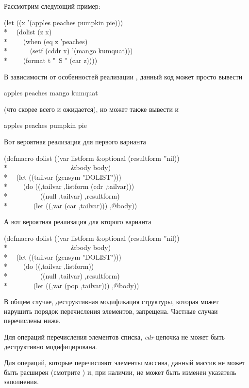 Рассмотрим следующий пример:
\begin{lisp}
(let ((x '(apples peaches pumpkin pie))) \\*
~~(dolist (z x) \\*
~~~~(when (eq z 'peaches) \\*
~~~~~~(setf (cddr x) '(mango kumquat))) \\*
~~~~(format t "~S " (car z))))
\end{lisp}
В зависимости от особенностей реализации , данный код может просто
вывести
\begin{lisp}
apples peaches mango kumquat
\end{lisp}
(что скорее всего и ожидается), но может также вывести и
\begin{lisp}
apples peaches pumpkin pie
\end{lisp}
Вот вероятная реализация  для первого варианта
\begin{lisp}
(defmacro dolist ((var listform \&optional (resultform ''nil)) \\*
~~~~~~~~~~~~~~~~~~\&body body) \\*
~~(let ((tailvar (gensym "DOLIST"))) \\*
~~~~{\Xbq}(do ((,tailvar ,listform (cdr ,tailvar))) \\*
~~~~~~~~~((null ,tailvar) ,resultform) \\*
~~~~~~~(let ((,var (car ,tailvar))) ,@body))
\end{lisp}
А вот вероятная реализация  для второго варианта
\begin{lisp}
(defmacro dolist ((var listform \&optional (resultform ''nil)) \\*
~~~~~~~~~~~~~~~~~~\&body body) \\*
~~(let ((tailvar (gensym "DOLIST"))) \\*
~~~~{\Xbq}(do ((,tailvar ,listform)) \\*
~~~~~~~~~((null ,tailvar) ,resultform) \\*
~~~~~~~(let ((,var (pop ,tailvar))) ,@body))
\end{lisp}

В общем случае, деструктивная модификация структуры, которая может нарушить
порядок перечисления элементов, запрещена. Частные случаи
перечислены ниже.

Для операций перечисления элементов списка, \emph{cdr} цепочка не может быть
деструктивно модифицирована.

Для операций, которые перечисляют элементы массива, данный массив не может быть
расширен (смотрите ) и, при наличии, не может быть изменен
указатель заполнения.


